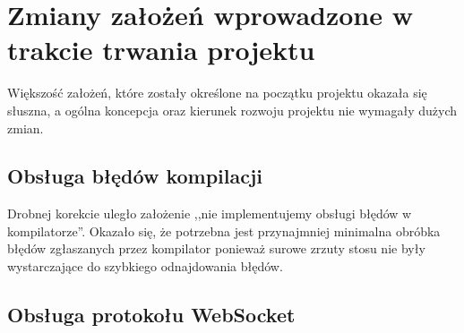 

\section{Zmiany założeń wprowadzone w trakcie trwania projektu}

Większość założeń, które zostały określone na początku projektu okazała się
słuszna, a ogólna koncepcja oraz kierunek rozwoju projektu nie wymagały dużych
zmian.

\subsection{Obsługa błędów kompilacji}

Drobnej korekcie uległo założenie ,,nie implementujemy obsługi błędów w
kompilatorze''. Okazało się, że potrzebna jest przynajmniej minimalna obróbka
błędów zgłaszanych przez kompilator ponieważ surowe zrzuty stosu nie były
wystarczające do szybkiego odnajdowania błędów.

\subsection{Obsługa protokołu WebSocket}

